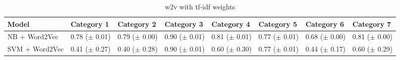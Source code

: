 \documentclass[a4paper,twoside,phd]{BYUPhys}
\begin{document}
\begin{table}[H]
	\centering
	\begin{tabular}{|p{1.7cm}|p{1.6cm}|p{1.6cm}|p{1.6cm}|p{1.6cm}|p{1.6cm}|p{1.6cm}|p{1.6cm}|}
		\hline
		Model & Category 1                                                                           & Category 2    & Category 3 & Category 4 & Category 5 & Category 6 & Category 7                                                                                                                                                                                                                                                                                                                                                          \\
		\hline                                                                                                                                              
		
		NB + Word2Vec  & 0.78 \newline ($\pm$ 0.01) & 0.79 \newline ($\pm$ 0.00) & 0.90 \newline ($\pm$ 0.01) & 0.81 \newline ($\pm$ 0.01) & 0.77 \newline ($\pm$ 0.01)  & 0.68 \newline ($\pm$ 0.00)   & 0.81 \newline ($\pm$ 0.00)  \\
		\hline
		
		SVM + Word2Vec  & 0.41 \newline ($\pm$ 0.27) & 0.40 \newline ($\pm$ 0.28) & 0.90 \newline ($\pm$ 0.01) & 0.60 \newline ($\pm$ 0.30) & 0.77 \newline ($\pm$ 0.01)  & 0.44 \newline ($\pm$ 0.17) & 0.60 \newline ($\pm$ 0.29)                                                                                                                                              \\
		\hline
		
	\end{tabular}
	\caption{w2v with tf-idf weights}
	\label{table:w2vtfidf}
\end{table}
\end{document}
